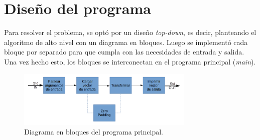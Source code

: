 \documentclass{article}
\begin{document}
\section{Diseño del programa}
    Para resolver el problema, se optó por un diseño \textit{top-down}, es decir,
  planteando el algoritmo de alto nivel con un diagrama en bloques. Luego se implementó
  cada bloque por separado para que cumpla con las necesidades de entrada y salida.
  Una vez hecho esto, los bloques se interconectan en el programa principal (\textit{main}).
  \begin{figure}[H]
  \begin{centering}
  \includegraphics[width=0.75\textwidth]{Imagenes/disenio_del_programa.png}
  \par\end{centering}
  \caption{Diagrama en bloques del programa principal.}
  \end{figure}
\end{document}
